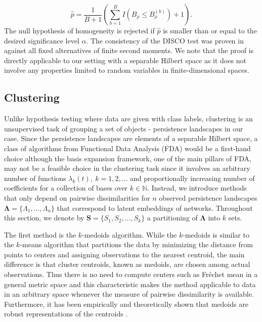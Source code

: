 \documentclass[12pt]{article}
\newcommand{\bbN}{\mathbb{N}}
\newcommand{\bfLambda}{\mathbf{\Lambda}}
\newcommand{\Frechet}{Fr\'{e}chet }
\begin{document}
\begin{equation}
\hat{p} = \frac{1}{B+1} \left(\sum_{b=1}^B I(B_\rho \leq B_\rho^{(b)}) + 1 \right).
\end{equation}
The null hypothesis of homogeneity is rejected if $\hat{p}$ is smaller than or equal to the desired significance level $\alpha$. The consistency of the DISCO test was proven in \cite{rizzo_disco_2010-1} against all fixed alternatives of finite second moments. We note that the proof is directly applicable to our setting with a separable Hilbert space as it does not involve any properties limited to random variables in finite-dimensional spaces.  




\subsection{Clustering}

Unlike hypothesis testing where data are given with class labels, clustering is an unsupervised task of grouping a set of objects - persistence landscapes in our case. Since the persistence landscapes are elements of a separable Hilbert space, a class of algorithms from Functional Data Analysis (FDA) \citep{ramsay_functional_2005, wang_functional_2016} would be a first-hand choice although the basis expansion framework, one of the main pillars of FDA, may not be a feasible choice in the clustering task since it involves an arbitrary number of functions $\lambda_k (t), ~k=1,2,\ldots$ and proportionally increasing number of coefficients for a collection of bases over $k\in \bbN$. Instead, we introduce methods that only depend on pairwise dissimilarities for $n$ observed persistence landscapes $ \bfLambda = \lbrace \Lambda_1,  \ldots, \Lambda_n \rbrace$  that correspond to latent embeddings of networks. Throughout this section,  we denote by $\mathbf{S} = \lbrace S_1, S_2, \ldots, S_k \rbrace$ a partitioning of $\bfLambda$ into $k$ sets.

The first method is the $k$-medoids algorithm. While the $k$-medoids is similar to the $k$-means algorithm \citep{macqueen_methods_1967-1} that partitions the data by minimizing the distance from points to centers and assigning observations to the nearest centroid, the main difference is that cluster centroids, known as medoids, are chosen among actual observations. Thus there is no need to compute centers such as \Frechet mean in a general metric space and this characteristic makes the method applicable to data in an arbitrary space whenever the measure of pairwise dissimilarity is available. Furthermore, it has been empirically and theoretically shown that medoids are robust representations of the centroids \citep{kaufman_partitioning_1990, van_der_laan_new_2003}. 
\end{document}
